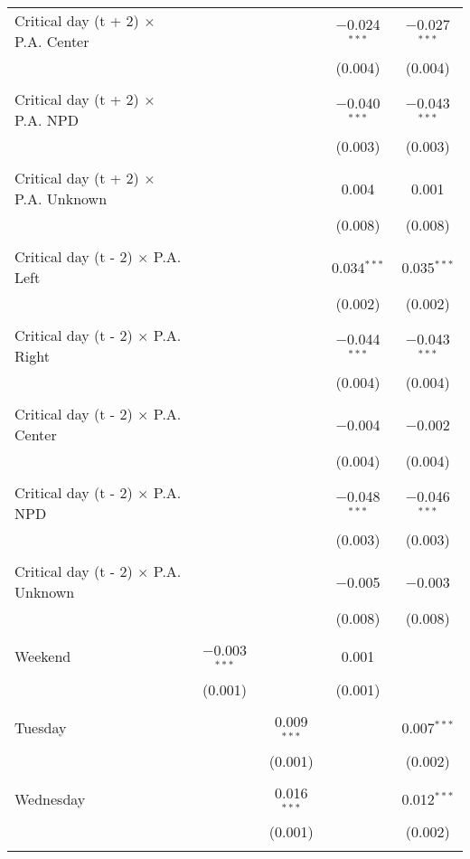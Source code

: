 \documentclass[
]{article}
\begin{document}
\begin{table}[!htbp]
{\begin{tabular}{@{\extracolsep{5pt}}lcccc}
 Critical day (t + 2) $\times$ P.A. Center &  &  & $-$0.024$^{***}$ & $-$0.027$^{***}$ \\ 
  &  &  & (0.004) & (0.004) \\ 
  & & & & \\ 
 Critical day (t + 2) $\times$ P.A. NPD &  &  & $-$0.040$^{***}$ & $-$0.043$^{***}$ \\ 
  &  &  & (0.003) & (0.003) \\ 
  & & & & \\ 
 Critical day (t + 2) $\times$ P.A. Unknown &  &  & 0.004 & 0.001 \\ 
  &  &  & (0.008) & (0.008) \\ 
  & & & & \\ 
 Critical day (t - 2) $\times$ P.A. Left &  &  & 0.034$^{***}$ & 0.035$^{***}$ \\ 
  &  &  & (0.002) & (0.002) \\ 
  & & & & \\ 
 Critical day (t - 2) $\times$ P.A. Right &  &  & $-$0.044$^{***}$ & $-$0.043$^{***}$ \\ 
  &  &  & (0.004) & (0.004) \\ 
  & & & & \\ 
 Critical day (t - 2) $\times$ P.A. Center &  &  & $-$0.004 & $-$0.002 \\ 
  &  &  & (0.004) & (0.004) \\ 
  & & & & \\ 
 Critical day (t - 2) $\times$ P.A. NPD &  &  & $-$0.048$^{***}$ & $-$0.046$^{***}$ \\ 
  &  &  & (0.003) & (0.003) \\ 
  & & & & \\ 
 Critical day (t - 2) $\times$ P.A. Unknown &  &  & $-$0.005 & $-$0.003 \\ 
  &  &  & (0.008) & (0.008) \\ 
  & & & & \\ 
 Weekend & $-$0.003$^{***}$ &  & 0.001 &  \\ 
  & (0.001) &  & (0.001) &  \\ 
  & & & & \\ 
 Tuesday &  & 0.009$^{***}$ &  & 0.007$^{***}$ \\ 
  &  & (0.001) &  & (0.002) \\ 
  & & & & \\ 
 Wednesday &  & 0.016$^{***}$ &  & 0.012$^{***}$ \\ 
  &  & (0.001) &  & (0.002) \\ 
  & & & & \\ 

\end{tabular}}
\end{table}
\end{document}
